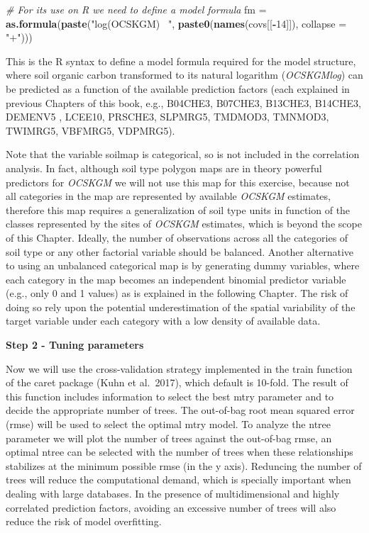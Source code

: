 \documentclass[10pt,b5paper,]{book}
\newenvironment{Shaded}{\begin{snugshade}}{\end{snugshade}}
\newcommand{\CommentTok}[1]{\textcolor[rgb]{0.56,0.35,0.01}{\textit{#1}}}
\newcommand{\DataTypeTok}[1]{\textcolor[rgb]{0.13,0.29,0.53}{#1}}
\newcommand{\DecValTok}[1]{\textcolor[rgb]{0.00,0.00,0.81}{#1}}
\newcommand{\KeywordTok}[1]{\textcolor[rgb]{0.13,0.29,0.53}{\textbf{#1}}}
\newcommand{\NormalTok}[1]{#1}
\newcommand{\OperatorTok}[1]{\textcolor[rgb]{0.81,0.36,0.00}{\textbf{#1}}}
\newcommand{\StringTok}[1]{\textcolor[rgb]{0.31,0.60,0.02}{#1}}
\theoremstyle{definition}
\theoremstyle{definition}
\theoremstyle{definition}
\theoremstyle{remark}
\begin{document}
\begin{Shaded}
\begin{Highlighting}[]
\CommentTok{# For its use on R we need to define a model formula}
\NormalTok{fm =}\StringTok{ }\KeywordTok{as.formula}\NormalTok{(}\KeywordTok{paste}\NormalTok{(}\StringTok{"log(OCSKGM) ~"}\NormalTok{, }\KeywordTok{paste0}\NormalTok{(}\KeywordTok{names}\NormalTok{(covs[[}\OperatorTok{-}\DecValTok{14}\NormalTok{]]),}
                                            \DataTypeTok{collapse =} \StringTok{"+"}\NormalTok{))) }
\end{Highlighting}
\end{Shaded}

This is the R syntax to define a model formula required for the model
structure, where soil organic carbon transformed to its natural
logarithm (\emph{OCSKGMlog}) can be predicted as a function of the
available prediction factors (each explained in previous Chapters of
this book, e.g., B04CHE3, B07CHE3, B13CHE3, B14CHE3, DEMENV5 , LCEE10,
PRSCHE3, SLPMRG5, TMDMOD3, TMNMOD3, TWIMRG5, VBFMRG5, VDPMRG5).

Note that the variable soilmap is categorical, so is not included in the
correlation analysis. In fact, although soil type polygon maps are in
theory powerful predictors for \emph{OCSKGM} we will not use this map
for this exercise, because not all categories in the map are represented
by available \emph{OCSKGM} estimates, therefore this map requires a
generalization of soil type units in function of the classes represented
by the sites of \emph{OCSKGM} estimates, which is beyond the scope of
this Chapter. Ideally, the number of observations across all the
categories of soil type or any other factorial variable should be
balanced. Another alternative to using an unbalanced categorical map is
by generating dummy variables, where each category in the map becomes an
independent binomial predictor variable (e.g., only 0 and 1 values) as
is explained in the following Chapter. The risk of doing so rely upon
the potential underestimation of the spatial variability of the target
variable under each category with a low density of available data.

\textbf{Step 2 - Tuning parameters}

Now we will use the cross-validation strategy implemented in the train
function of the caret package (Kuhn et al.~2017), which default is
10-fold. The result of this function includes information to select the
best mtry parameter and to decide the appropriate number of trees. The
out-of-bag root mean squared error (rmse) will be used to select the
optimal mtry model. To analyze the ntree parameter we will plot the
number of trees against the out-of-bag rmse, an optimal ntree can be
selected with the number of trees when these relationships stabilizes at
the minimum possible rmse (in the y axis). Reduncing the number of trees
will reduce the computational demand, which is specially important when
dealing with large databases. In the presence of multidimensional and
highly correlated prediction factors, avoiding an excessive number of
trees will also reduce the risk of model overfitting.
\end{document}

